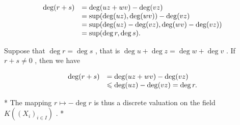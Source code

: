 \[
\begin{array}{r l} \deg (r + s) & = \deg (u z + w v) - \deg (v z) \\ & = \sup (\deg (u z), \deg (w v)) - \deg (v z) \\ & = \sup (\deg (u z) - \deg (v z), \deg (w v) - \deg (v z)) \\ & = \sup (\deg r, \deg s). \end{array}
\]

Suppose that \(\deg r = \deg s\) , that is \(\deg u + \deg z = \deg w + \deg v\) . If \(r + s \neq 0\) , then we have

\[
\begin{array}{r l} \deg (r + s) & = \deg (u z + w v) - \deg (v z) \\ & \leqslant \deg (u z) - \deg (v z) = \deg r. \end{array}
\]

* The mapping \(r \mapsto -\deg r\) is thus a discrete valuation on the field \(K((X_i)_{i \in I})\) . *

